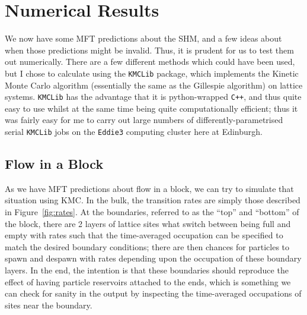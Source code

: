 \section{Numerical Results}
\label{sec:numRes}
We now have some MFT predictions about the SHM, and a few ideas about when those predictions might be invalid. Thus, it is prudent for us to test them out numerically.
There are a few different methods which could have been used, but I chose to calculate using the \texttt{KMCLib}\cite{leetmaa2014kmclib} package, which implements the Kinetic Monte Carlo algorithm (essentially the same as the Gillespie algorithm)
on lattice systems. \texttt{KMCLib} has the advantage that it is python-wrapped \texttt{C++}, and thus quite easy to use whilst at the same time being quite computationally efficient; thus it was fairly easy for me to carry out large numbers
of differently-parametrised serial \texttt{KMCLib} jobs on the \texttt{Eddie3} computing cluster here at Edinburgh.
\subsection{Flow in a Block}
As we have MFT predictions about flow in a block, we can try to simulate that situation using KMC. In the bulk, the transition rates are simply those described in Figure~\ref{fig:rates}. At the boundaries, referred to as the ``top'' and ``bottom''
of the block, there are 2 layers of lattice sites what switch between being full and empty with rates such that the time-averaged occupation can be specified to match the desired boundary conditions; there are then chances for particles to spawn
and despawn with rates depending upon the occupation of these boundary layers. In the end, the intention is that these boundaries should reproduce the effect of having particle reservoirs attached to the ends, which is something we can check for
sanity in the output by inspecting the time-averaged occupations of sites near the boundary.

